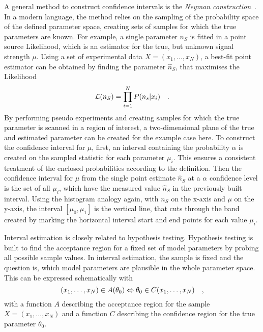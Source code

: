 A general method to construct confidence intervals is the \emph{Neyman construction} .
In a modern language, the method relies on the sampling of the probability space of the defined parameter space, creating sets of samples for which the true parameters are known.
For example, a single parameter $n_S$ is fitted in a point source Likelihood, which is an estimator for the true, but unknown signal strength $\mu$.
Using a set of experimental data $X=(x_1, \dots, x_N)$, a best-fit point estimator can be obtained by finding the parameter $\hat{n}_S$, that maximises the Likelihood
\begin{equation}
  \mathcal{L}(n_S) = \prod_{i=1}^N P(n_s|x_i)
  \quad\text{.}
\end{equation}
By performing pseudo experiments and creating samples for which the true parameter is scanned in a region of interest, a two-dimensional plane of the true and estimated parameter can be created for the example case here.
To construct the confidence interval for $\mu$, first, an interval containing the probability $\alpha$ is created on the sampled statistic for each parameter $\mu_i$.
This ensures a consistent treatment of the enclosed probabilities according to the definition.
Then the confidence interval for $\mu$ from the single point estimate $\hat{n}_S$ at a $\alpha$ confidence level is the set of all $\mu_i$, which have the measured value $\hat{n}_S$ in the previously built interval.
Using the histogram analogy again, with $n_S$ on the x-axis and $\mu$ on the y-axis, the interval $[\mu_0, \mu_1]$ is the vertical line, that cuts through the band created by marking the horizontal interval start and end points for each value $\mu_i$.

Interval estimation is closely related to hypothesis testing.
Hypothesis testing is built to find the acceptance region for a fixed set of model parameters by probing all possible sample values.
In interval estimation, the sample is fixed and the question is, which model parameters are plausible in the whole parameter space.
This can be expressed schematically with
\begin{equation}
  (x_1, \dots, x_N) \in A(\theta_0)
  \Leftrightarrow
  \theta_0 \in C(x_1, \dots, x_N)
  \quad\text{,}
\end{equation}
with a function $A$ describing the acceptance region for the sample $X=(x_1, \dots, x_N)$ and a function $C$ describing the confidence region for the true parameter $\theta_0$.
